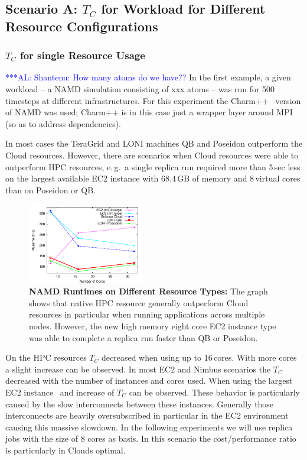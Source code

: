 \documentclass[conference,final]{IEEEtran}
\newcommand{\tc}{$T_{C}$ }
\newcommand{\alnote}[1]{ {\textcolor{blue} { ***AL: #1 }}}
\newcommand{\alnote}[1]{}
\begin{document}
\subsection{Scenario A: \tc for Workload for Different Resource Configurations}

\subsubsection{\tc for single Resource Usage}
\alnote{Shantenu: How many atoms do we have??}
In the first example, a given workload -- a NAMD simulation consisting
of xxx atoms -- was run for 500 timesteps at different
infrastructures. For this experiment the Charm++~\cite{871085} version
of NAMD was used; Charm++ is in this case just a wrapper layer around
MPI (so as to address dependencies).

In most cases the TeraGrid and LONI machines QB and Poseidon
outperform the Cloud resources.  However, there are scenarios when
Cloud resources were able to outperform HPC resources, e.\,g.\ a
single replica run required more than 5\,sec less on the largest
available EC2 instance with 68.4\,GB of memory and 8\,virtual cores
than on Poseidon or QB.

\begin{figure}[htbp]
    \centering
    \includegraphics[width=0.45\textwidth]{performance/namd_run.pdf}
    \caption{\textbf{NAMD Runtimes on Different Resource Types: } The
      graph shows that native HPC resource generally outperform Cloud
      resources in particular when running applications across
      multiple nodes. However, the new high memory eight core EC2
      instance type was able to complete a replica run faster than QB
      or Poseidon.}
    \label{fig:performance_namd_run}
\end{figure}

On the HPC resources \tc decreased when using up to 16\,cores. With
more cores a slight increase can be observed. In most EC2 and Nimbus
scenarios the \tc decreased with the number of instances and cores
used. When using the largest EC2 instance~\cite{new-ec2} and increase
of \tc can be observed. These behavior is particularly caused by the
slow interconnects between these instances. Generally those
interconnects are heavily oversubscribed in particular in the EC2
environment causing this massive slowdown. In the following
experiments we will use replica jobs with the size of 8 cores as
basis. In this scenario the cost/performance ratio is particularly in
Clouds optimal.
\end{document}
